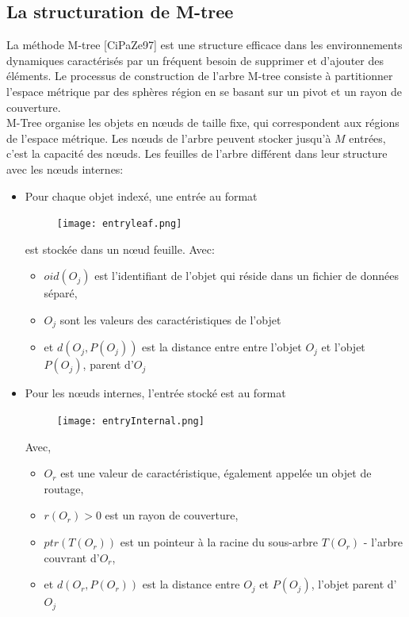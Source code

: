 \subsection{La structuration de M-tree}
La méthode M-tree [CiPaZe97] est une structure efficace dans les environnements dynamiques caractérisés par un fréquent besoin de supprimer et d'ajouter des éléments. Le processus de construction de l'arbre M-tree consiste à partitionner l'espace métrique par des sphères région en se basant sur un pivot et un rayon de couverture. \\

M-Tree organise les objets en nœuds de taille fixe, qui correspondent aux régions de l'espace métrique. Les nœuds de l'arbre peuvent stocker jusqu'à \textbf{$ M $} entrées, c'est la capacité des nœuds. Les feuilles de l’arbre différent dans leur structure avec les nœuds internes:
\begin{itemize}
	\item Pour chaque objet indexé, une entrée au format 
	\begin{figure}[H]
		\centering
		\texttt{[image: entryleaf.png]} %
	\end{figure} 
	est stockée dans un nœud feuille. Avec:
	\begin{itemize}
		\item \textbf{$ oid(O_j) $} est l'identifiant de l'objet qui réside dans un fichier de données séparé,
		\item \textbf{$ O_j $} sont les valeurs des caractéristiques de l'objet 
		\item et \textbf{$ d(O_j, P(O_j)) $} est la distance entre entre l’objet \textbf{$ O_j $} et l’objet  \textbf{$ P(O_j) $}, parent d'\textbf{$ O_j $}
	\end{itemize}

	\item Pour les nœuds internes, l'entrée stocké est au format
	\begin{figure}[H]
		\centering
		\texttt{[image: entryInternal.png]} %
	\end{figure} 
	Avec,
	\begin{itemize}
		\item \textbf{$ O_r $} est une valeur de caractéristique, également appelée un objet de routage,
		\item \textbf{$ r(O_r) $}$>0$ est un rayon de couverture, 
		\item \textbf{$ ptr(T( O_r)) $} est un pointeur à la racine du sous-arbre \textbf{$ T(O_r) $} - l'arbre couvrant d'\textbf{$ O_r $}, 
		\item et \textbf{$ d(O_r, P(O_r)) $} est la distance entre \textbf{$ O_j $} et \textbf{$ P(O_j) $}, l'objet parent d'\textbf{$ O_j $}\\
		
	\end{itemize}
\end{itemize}


